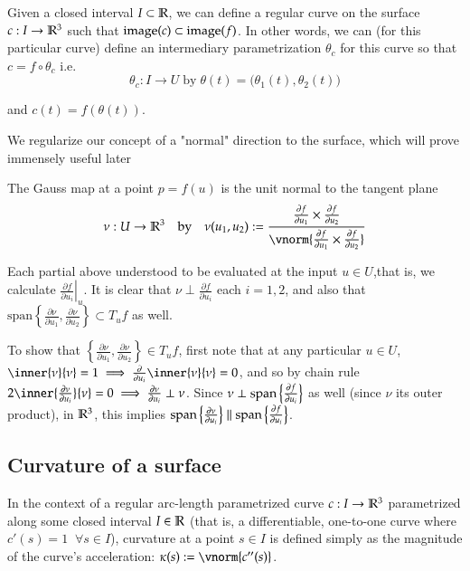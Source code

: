   	
  	\begin{defn} \label{def:curve-on-a-surface}
Given a closed interval $I \subset \mathbb{R}$, we can define a regular curve on the surface
$c: I \to \mathbb{R}^3$ such that $\mathrm{image}(c) \subset \mathrm{image}(f)$. In other words, we can (for this particular curve) define an intermediary parametrization $\theta_c$ for this curve so that
  $ c = f \circ \theta_c $ i.e.
\[
\theta_c : I \to U \; \textrm{by} \; \theta(t) = \big(\theta_1(t), \theta_2(t)\big)
\]

and $c(t) = f(\theta(t))$.
\end{defn}

We regularize our concept of a "normal" direction to the surface, which will prove immensely useful later 
\begin{defn}
The Gauss map at a point $p = f(u)$ is the unit normal to the tangent plane
\[\nu : U \to \R^3 \quad\textrm{by}\quad  \nu(u_1, u_2) :=
\frac{\frac{\partial f}{\partial u_1} \times \frac{\partial f}{\partial u_2}}
{\vnorm{\frac{\partial f}{\partial u_1} \times \frac{\partial f}{\partial u_2}}} \]
\end{defn}
Each partial above understood to be evaluated at the input $u \in U$,that is, we calculate $\left.\frac{\partial f}{\partial u_i}\right|_u$.
It is clear that $\nu \perp \frac{\partial f}{\partial u_i}$ each $i=1,2$, and also that
$\textrm{span}\left\{ \frac{\partial \nu}{\partial u_1}, \frac{\partial \nu}{\partial u_2}\right\} \subset T_u f$ as well.

To show that $\left\{\frac{\partial \nu}{\partial u_1} , \frac{\partial \nu}{\partial u_2}\right\} \in T_u f$,
first note that at any particular $u \in U$,
$\inner{\nu}{\nu} = 1 \implies \frac{\partial}{\partial u_i} \inner{\nu}{\nu} = 0$,
and so by chain rule $2\inner{\frac{\partial \nu}{\partial u_i}}{\nu} = 0
\implies \frac{\partial \nu}{\partial u_i} \perp \nu $.
Since $ \nu \perp \mathrm{span}\left\{\frac{\partial f}{\partial u_i}\right\} $ as well (since $\nu$ its outer product), in  $\mathbb{R}^3$, this implies
$\mathrm{span}\left\{\frac{\partial \nu}{\partial u_i}\right\} \parallel
\mathrm{span}\left\{\frac{\partial f}{\partial u_i}\right\}$.

    \subsection{Curvature of a surface}
    In the context of a regular arc-length parametrized curve $c: I \to \mathbb{R}^3$ parametrized along some closed interval $I\in \mathbb{R}$
     (that is, a differentiable, one-to-one curve where $c'(s) = 1 \;\; \forall s \in I$), curvature at a point $s \in I$ is defined simply as the magnitude of the curve's acceleration: $\kappa(s) := \vnorm{c''(s)}$.
 
